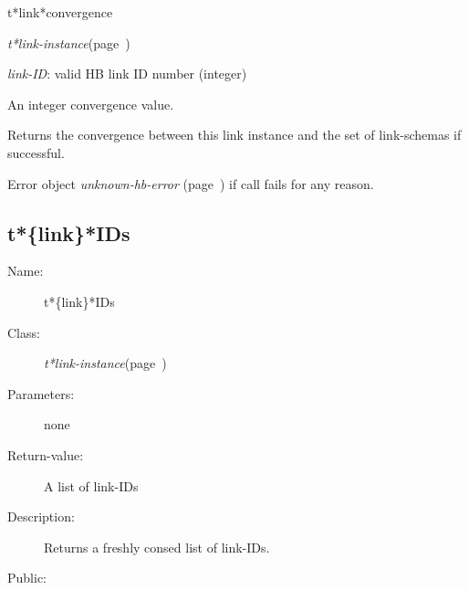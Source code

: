 \begin{description}
\item [Name:]  t*link*convergence

\item [Class:] {\sl t*link-instance}\hfill(page~\pageref{t*link-instance})

\item [Parameters:]
\item {\sl link-ID}:  
valid HB link ID number (integer)



\item [Return-value:]

An integer convergence value.

\item [Description:]

Returns the convergence between this link instance and
the set of link-schemas if successful.

Error object {\sl unknown-hb-error} (page~\pageref{unknown-hb-error}) if call fails for
any reason.

\item [Public:]



\end{description}
\horizontalline

\subsection{t*\{link\}*IDs}
\label{t*link*IDs}

\begin{description}
\item [Name:]  t*\{link\}*IDs

\item [Class:] {\sl t*link-instance}\hfill(page~\pageref{t*link-instance})

\item [Parameters:] none

\item [Return-value:] A list of link-IDs

\item [Description:]

Returns a freshly consed list of link-IDs.

\item [Public:]



\end{description}
\horizontalline

